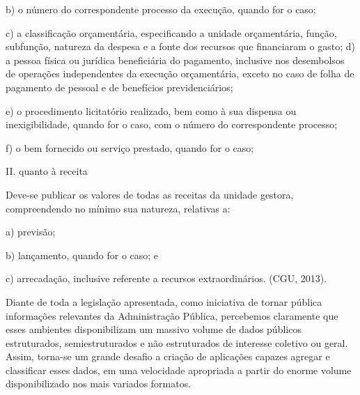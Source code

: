 b) o número do correspondente processo da execução, quando for o caso;  

c) a classificação orçamentária, especificando a unidade orçamentária, função, subfunção, natureza da despesa e a fonte dos recursos que financiaram o gasto; d) a pessoa física ou jurídica beneficiária do pagamento, inclusive nos desembolsos de operações independentes da execução orçamentária, exceto no caso de folha de pagamento de pessoal e de benefícios previdenciários;  

e) o procedimento licitatório realizado, bem como à sua dispensa ou inexigibilidade, quando for o caso, com o número do correspondente processo;  

f) o bem fornecido ou serviço prestado, quando for o caso;  

II. quanto à receita  

Deve-se publicar os valores de todas as receitas da unidade gestora, compreendendo no mínimo sua natureza, relativas a:  

a) previsão;  

b) lançamento, quando for o caso; e  

c) arrecadação, inclusive referente a recursos extraordinários. (CGU, 2013). 

Diante de toda a legislação apresentada, como iniciativa de tornar pública informações relevantes da Administração Pública, percebemos claramente que esses ambientes disponibilizam um massivo volume de dados públicos estruturados, semiestruturados e não estruturados de interesse coletivo ou geral. Assim, torna-se um grande desafio a criação de aplicações capazes agregar e classificar esses dados, em uma velocidade apropriada a partir do enorme volume disponibilizado nos mais variados formatos.  

